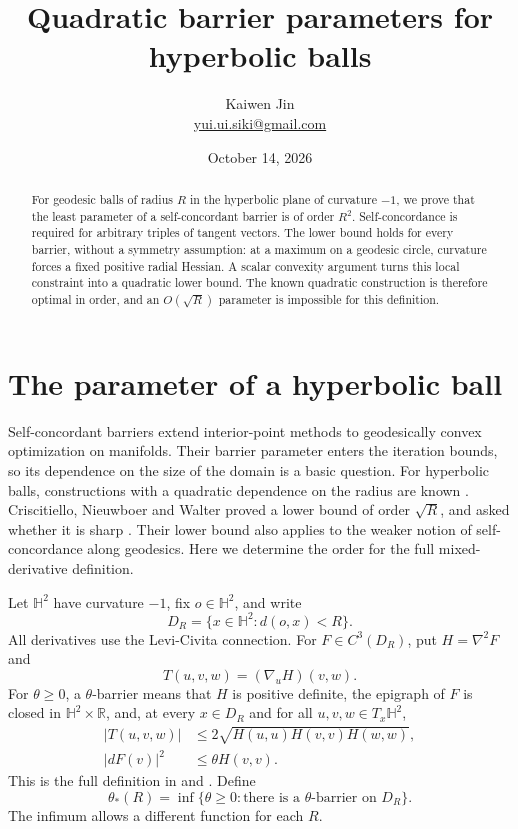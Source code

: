 \documentclass[11pt]{article}
\title{Quadratic barrier parameters for hyperbolic balls}
\author{Kaiwen Jin\\\small\href{mailto:yui.ui.siki@gmail.com}{yui.ui.siki@gmail.com}}
\date{October 14, 2026}
\newcommand{\HH}{\mathbb H}
\newcommand{\R}{\mathbb R}
\begin{document}
\maketitle
\begin{abstract}
For geodesic balls of radius \(R\) in the hyperbolic plane of curvature
\(-1\), we prove that the least parameter of a self-concordant barrier is
of order \(R^2\). Self-concordance is required for arbitrary triples of
tangent vectors. The lower bound holds for every barrier, without a
symmetry assumption: at a maximum on a geodesic circle, curvature forces
a fixed positive radial Hessian. A scalar convexity argument turns this
local constraint into a quadratic lower bound. The known quadratic
construction is therefore optimal in order, and an \(O(\sqrt R)\)
parameter is impossible for this definition.
\end{abstract}

\section{The parameter of a hyperbolic ball}

Self-concordant barriers extend interior-point methods to geodesically
convex optimization on manifolds. Their barrier parameter enters the
iteration bounds, so its dependence on the size of the domain is a basic
question. For hyperbolic balls, constructions with a quadratic dependence
on the radius are known \cite{Hirai,HNW}. Criscitiello, Nieuwboer and Walter
proved a lower bound of order \(\sqrt R\), and asked whether it is sharp
\cite[Corollary~1.4 and the following paragraph]{CNW}. Their lower bound
also applies to the weaker notion of self-concordance along geodesics.
Here we determine the order for the full mixed-derivative definition.

Let \(\HH^2\) have curvature \(-1\), fix \(o\in\HH^2\), and write
\[
 D_R=\{x\in\HH^2:d(o,x)<R\}.
\]
All derivatives use the Levi-Civita connection. For \(F\in C^3(D_R)\),
put \(H=\nabla^2F\) and
\[
 T(u,v,w)=(\nabla_uH)(v,w).
\]
For \(\theta\geq0\), a \(\theta\)-barrier means that \(H\) is positive
definite, the epigraph of \(F\) is closed in \(\HH^2\times\R\), and, at
every \(x\in D_R\) and for all \(u,v,w\in T_x\HH^2\),
\begin{align}
 |T(u,v,w)|&\leq2\sqrt{H(u,u)H(v,v)H(w,w)},\label{eq:SC}\\
 |dF(v)|^2&\leq\theta H(v,v).\label{eq:gradient}
\end{align}
This is the full definition in \cite[Definition~1.1 and Definition~4.1]{HNW}
and \cite[Section~2.3]{CNW}. Define
\[
 \theta_*(R)=\inf\{\theta\geq0:
       \text{there is a \(\theta\)-barrier on \(D_R\)}\}.
\]
The infimum allows a different function for each \(R\).
\end{document}
